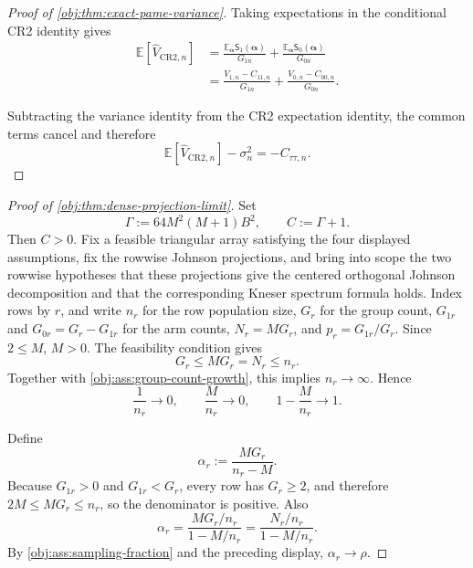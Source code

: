 \begin{proof}[Proof of \cref{obj:thm:exact-pame-variance}]
Taking expectations in the conditional CR2 identity gives
\[
\begin{aligned}
\mathbb E[\widehat V_{\mathrm{CR2},n}]
&=
\frac{\mathbb E_{\boldsymbol\alpha}\mathsf S_1(\boldsymbol\alpha)}{G_{1n}}
+
\frac{\mathbb E_{\boldsymbol\alpha}\mathsf S_0(\boldsymbol\alpha)}{G_{0n}} \\
&=
\frac{V_{1,n}-C_{11,n}}{G_{1n}}
+
\frac{V_{0,n}-C_{00,n}}{G_{0n}} .
\end{aligned}
\]

Subtracting the variance identity from the CR2 expectation identity, the common terms cancel and therefore
\[
\mathbb E[\widehat V_{\mathrm{CR2},n}]-\sigma_n^2
=
-C_{\tau\tau,n}.
\]
\end{proof}

\begin{proof}[Proof of \cref{obj:thm:dense-projection-limit}]
Set
\[
\Gamma:=64M^2(M+1)B^2,
\qquad
C:=\Gamma+1 .
\]
Then \(C>0\).  Fix a feasible triangular array satisfying the four displayed assumptions, fix the rowwise Johnson projections, and bring into scope the two rowwise hypotheses that these projections give the centered orthogonal Johnson decomposition and that the corresponding Kneser spectrum formula holds.  Index rows by \(r\), and write \(n_r\) for the row population size, \(G_r\) for the group count, \(G_{1r}\) and \(G_{0r}=G_r-G_{1r}\) for the arm counts, \(N_r=MG_r\), and \(p_r=G_{1r}/G_r\).  Since \(2\le M\), \(M>0\).  The feasibility condition gives
\[
G_r\le MG_r=N_r\le n_r .
\]
Together with \cref{obj:ass:group-count-growth}, this implies \(n_r\to\infty\).  Hence
\[
\frac1{n_r}\to0,\qquad
\frac{M}{n_r}\to0,\qquad
1-\frac{M}{n_r}\to1 .
\]

Define
\[
\alpha_r:=\frac{MG_r}{n_r-M}.
\]
Because \(G_{1r}>0\) and \(G_{1r}<G_r\), every row has \(G_r\ge2\), and therefore \(2M\le MG_r\le n_r\), so the denominator is positive.  Also
\[
\alpha_r
=
\frac{MG_r/n_r}{1-M/n_r}
=
\frac{N_r/n_r}{1-M/n_r}.
\]
By \cref{obj:ass:sampling-fraction} and the preceding display, \(\alpha_r\to\rho\).


\end{proof}

